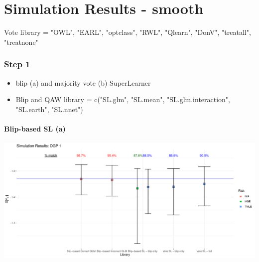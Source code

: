 \documentclass[11pt]{article}\usepackage[]{graphicx}\usepackage[]{color}
\makeatletter
\def\maxwidth{ %
  \ifdim\Gin@nat@width>\linewidth
    \linewidth
  \else
    \Gin@nat@width
  \fi
}
\makeatother
\begin{document}
\part*{Simulation Results - smooth}

Vote library = "OWL", "EARL", "optclass", "RWL", "Qlearn", "DonV", "treatall", "treatnone"




\section{Step 1}

\begin{itemize}
\item blip (a) and majority vote (b) SuperLearner
\item Blip and QAW library = c("SL.glm", "SL.mean", "SL.glm.interaction", "SL.earth", "SL.nnet")
\end{itemize}




\subsection{Blip-based SL (a)}

\includegraphics[width=\maxwidth]{figure/ODTR_DGP_smooth_step1a-1} 
\begin{table}[ht]
\centering
{}
\caption{smooth - step1a} 
\end{table}
\end{document}
